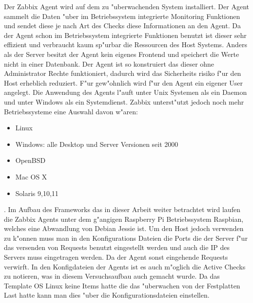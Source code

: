 Der Zabbix Agent wird auf dem zu "uberwachenden System installiert. Der Agent sammelt die Daten "uber im Betriebssystem %
integrierte Monitoring Funktionen und sendet diese je nach Art des Checks diese Informationen an den Agent. %
Da der Agent schon im Betriebssystem integrierte Funktionen benutzt ist dieser sehr effizient und verbraucht kaum sp"urbar %
die Ressourcen des Host Systems. Anders als der Server besitzt der Agent kein eigenes Frontend und speichert die Werte nicht %
in einer Datenbank. Der Agent ist so konstruiert das dieser ohne Administrator Rechte funktioniert, dadurch wird das Sicherheits%
risiko f"ur den Host erheblich reduziert. F"ur gew"ohnlich wird f"ur den Agent ein eigener User angelegt. Die Anwendung des Agents %
l"auft unter Unix Systemen als ein Daemon und unter Windows als ein Systemdienst. Zabbix unterst"utzt jedoch noch mehr %
Betriebssysteme eine Auswahl davon w"aren: 
\begin{itemize}
\item Linux
\item Windows: alle Desktop und Server Versionen seit 2000
\item OpenBSD
\item Mac OS X
\item Solaris 9,10,11
\end{itemize}
\autocite{zabbix:agent}.
Im Aufbau des Frameworks das in dieser Arbeit weiter betrachtet wird laufen die Zabbix Agents unter dem g"angigen Raspberry Pi %
Betriebssystem Raspbian, welches eine Abwandlung von Debian Jessie ist. Um den Host jedoch verwenden zu k"onnen muss man in %
den Konfigurations Dateien die Ports die der Server f"ur das versenden von Requests benutzt eingestellt werden und auch die IP des Servers %
muss eingetragen werden. Da der Agent sonst eingehende Requests verwirft. In den Konfigdateien der Agents ist es auch m"oglich %
die Active Checks zu notieren, was in diesem Versuchsaufbau auch gemacht wurde. Da das Template OS Linux keine Items hatte die das %
"uberwachen von der Festplatten Last hatte kann man dies "uber die Konfigurationsdateien einstellen. 














